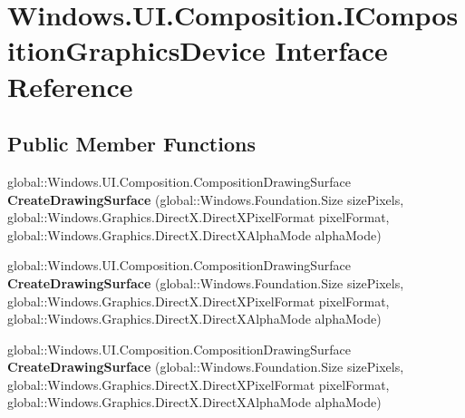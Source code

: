 \hypertarget{interface_windows_1_1_u_i_1_1_composition_1_1_i_composition_graphics_device}{}\section{Windows.\+U\+I.\+Composition.\+I\+Composition\+Graphics\+Device Interface Reference}
\label{interface_windows_1_1_u_i_1_1_composition_1_1_i_composition_graphics_device}
\subsection*{Public Member Functions}
\begin{DoxyCompactItemize}
\item 
\mbox{\label{interface_windows_1_1_u_i_1_1_composition_1_1_i_composition_graphics_device_ae97c7fbac0ad9b00790ef52577c30963}} 
global\+::\+Windows.\+U\+I.\+Composition.\+Composition\+Drawing\+Surface {\bfseries Create\+Drawing\+Surface} (global\+::\+Windows.\+Foundation.\+Size size\+Pixels, global\+::\+Windows.\+Graphics.\+Direct\+X.\+Direct\+X\+Pixel\+Format pixel\+Format, global\+::\+Windows.\+Graphics.\+Direct\+X.\+Direct\+X\+Alpha\+Mode alpha\+Mode)
\item 
\mbox{\label{interface_windows_1_1_u_i_1_1_composition_1_1_i_composition_graphics_device_ae97c7fbac0ad9b00790ef52577c30963}} 
global\+::\+Windows.\+U\+I.\+Composition.\+Composition\+Drawing\+Surface {\bfseries Create\+Drawing\+Surface} (global\+::\+Windows.\+Foundation.\+Size size\+Pixels, global\+::\+Windows.\+Graphics.\+Direct\+X.\+Direct\+X\+Pixel\+Format pixel\+Format, global\+::\+Windows.\+Graphics.\+Direct\+X.\+Direct\+X\+Alpha\+Mode alpha\+Mode)
\item 
\mbox{\label{interface_windows_1_1_u_i_1_1_composition_1_1_i_composition_graphics_device_ae97c7fbac0ad9b00790ef52577c30963}} 
global\+::\+Windows.\+U\+I.\+Composition.\+Composition\+Drawing\+Surface {\bfseries Create\+Drawing\+Surface} (global\+::\+Windows.\+Foundation.\+Size size\+Pixels, global\+::\+Windows.\+Graphics.\+Direct\+X.\+Direct\+X\+Pixel\+Format pixel\+Format, global\+::\+Windows.\+Graphics.\+Direct\+X.\+Direct\+X\+Alpha\+Mode alpha\+Mode)

\end{DoxyCompactItemize}
